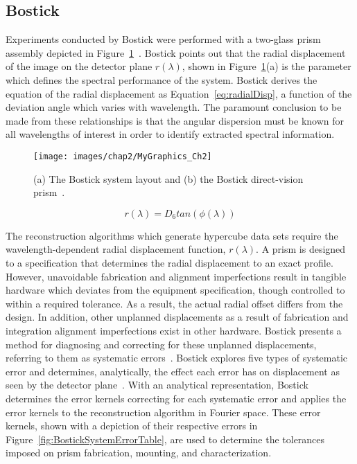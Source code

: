 \subsection{Bostick}
Experiments conducted by Bostick were performed with a two-glass prism assembly depicted in Figure~\ref{fig:BostickPrism}~\cite{Bostick}. Bostick points out that the radial displacement of the image on the detector plane $r(\lambda)$, shown in Figure~\ref{fig:BostickPrism}(a) is the parameter which defines the spectral performance of the system. Bostick derives the equation of the radial displacement as Equation~\eqref{eq:radialDisp}, a function of the deviation angle which varies with wavelength. The paramount conclusion to be made from these relationships is that the angular dispersion must be known for all wavelengths of interest in order to identify extracted spectral information.
 
\begin{figure}[htb]		%
\centering
\texttt{[image: images/chap2/MyGraphics\_Ch2]}
\caption{(a) The Bostick system layout and (b) the Bostick direct-vision prism~\cite{Bostick}.}
\label{fig:BostickPrism}
\end{figure}

\begin{equation}		%
\label{eq:radialDisp}
r(\lambda) = D_6tan(\phi(\lambda))
\end{equation}

The reconstruction algorithms which generate hypercube data sets require the wavelength-dependent radial displacement function, $r(\lambda)$. A prism is designed to a specification that determines the radial displacement to an exact profile. However, unavoidable fabrication and alignment imperfections result in tangible hardware which deviates from the equipment specification, though controlled to within a required tolerance. As a result, the actual radial offset differs from the design. In addition, other unplanned displacements as a result of fabrication and integration alignment imperfections exist in other hardware. Bostick presents a method for diagnosing and correcting for these unplanned displacements, referring to them as systematic errors~\cite{Bostick10}. Bostick explores five types of systematic error and determines, analytically, the effect each error has on displacement as seen by the detector plane~\cite{Bostick}. With an analytical representation, Bostick determines the error kernels correcting for each systematic error and applies the error kernels to the reconstruction algorithm in Fourier space. These error kernels, shown with a depiction of their respective errors in Figure~\ref{fig:BostickSystemErrorTable}, are used to determine the tolerances imposed on prism fabrication, mounting, and characterization.

